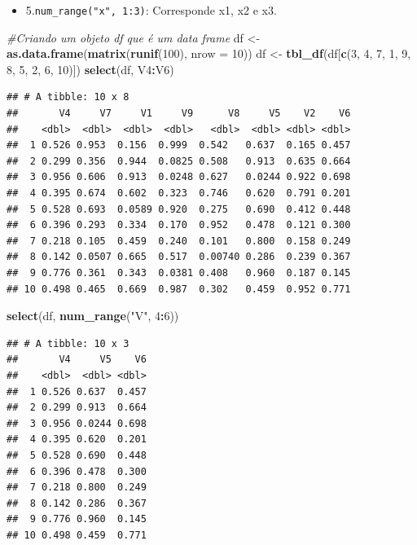 \documentclass[]{book}
\newenvironment{Shaded}{\begin{snugshade}}{\end{snugshade}}
\newcommand{\CommentTok}[1]{\textcolor[rgb]{0.56,0.35,0.01}{\textit{#1}}}
\newcommand{\DataTypeTok}[1]{\textcolor[rgb]{0.13,0.29,0.53}{#1}}
\newcommand{\DecValTok}[1]{\textcolor[rgb]{0.00,0.00,0.81}{#1}}
\newcommand{\KeywordTok}[1]{\textcolor[rgb]{0.13,0.29,0.53}{\textbf{#1}}}
\newcommand{\NormalTok}[1]{#1}
\newcommand{\OperatorTok}[1]{\textcolor[rgb]{0.81,0.36,0.00}{\textbf{#1}}}
\newcommand{\StringTok}[1]{\textcolor[rgb]{0.31,0.60,0.02}{#1}}
\providecommand{\tightlist}{%
  \setlength{\itemsep}{0pt}\setlength{\parskip}{0pt}}
\begin{document}
\begin{itemize}
\tightlist
\item
  5.\texttt{num\_range("x",\ 1:3)}: Corresponde x1, x2 e x3.
\end{itemize}

\begin{Shaded}
\begin{Highlighting}[]
\CommentTok{#Criando um objeto df que é um data frame}
\NormalTok{df <-}\StringTok{ }\KeywordTok{as.data.frame}\NormalTok{(}\KeywordTok{matrix}\NormalTok{(}\KeywordTok{runif}\NormalTok{(}\DecValTok{100}\NormalTok{), }\DataTypeTok{nrow =} \DecValTok{10}\NormalTok{)) }
\NormalTok{df <-}\StringTok{ }\KeywordTok{tbl_df}\NormalTok{(df[}\KeywordTok{c}\NormalTok{(}\DecValTok{3}\NormalTok{, }\DecValTok{4}\NormalTok{, }\DecValTok{7}\NormalTok{, }\DecValTok{1}\NormalTok{, }\DecValTok{9}\NormalTok{, }\DecValTok{8}\NormalTok{, }\DecValTok{5}\NormalTok{, }\DecValTok{2}\NormalTok{, }\DecValTok{6}\NormalTok{, }\DecValTok{10}\NormalTok{)])}
\KeywordTok{select}\NormalTok{(df, V4}\OperatorTok{:}\NormalTok{V6)}
\end{Highlighting}
\end{Shaded}

\begin{verbatim}
## # A tibble: 10 x 8
##       V4     V7     V1     V9      V8     V5    V2    V6
##    <dbl>  <dbl>  <dbl>  <dbl>   <dbl>  <dbl> <dbl> <dbl>
##  1 0.526 0.953  0.156  0.999  0.542   0.637  0.165 0.457
##  2 0.299 0.356  0.944  0.0825 0.508   0.913  0.635 0.664
##  3 0.956 0.606  0.913  0.0248 0.627   0.0244 0.922 0.698
##  4 0.395 0.674  0.602  0.323  0.746   0.620  0.791 0.201
##  5 0.528 0.693  0.0589 0.920  0.275   0.690  0.412 0.448
##  6 0.396 0.293  0.334  0.170  0.952   0.478  0.121 0.300
##  7 0.218 0.105  0.459  0.240  0.101   0.800  0.158 0.249
##  8 0.142 0.0507 0.665  0.517  0.00740 0.286  0.239 0.367
##  9 0.776 0.361  0.343  0.0381 0.408   0.960  0.187 0.145
## 10 0.498 0.465  0.669  0.987  0.302   0.459  0.952 0.771
\end{verbatim}

\begin{Shaded}
\begin{Highlighting}[]
\KeywordTok{select}\NormalTok{(df, }\KeywordTok{num_range}\NormalTok{(}\StringTok{"V"}\NormalTok{, }\DecValTok{4}\OperatorTok{:}\DecValTok{6}\NormalTok{))}
\end{Highlighting}
\end{Shaded}

\begin{verbatim}
## # A tibble: 10 x 3
##       V4     V5    V6
##    <dbl>  <dbl> <dbl>
##  1 0.526 0.637  0.457
##  2 0.299 0.913  0.664
##  3 0.956 0.0244 0.698
##  4 0.395 0.620  0.201
##  5 0.528 0.690  0.448
##  6 0.396 0.478  0.300
##  7 0.218 0.800  0.249
##  8 0.142 0.286  0.367
##  9 0.776 0.960  0.145
## 10 0.498 0.459  0.771
\end{verbatim}
\end{document}
